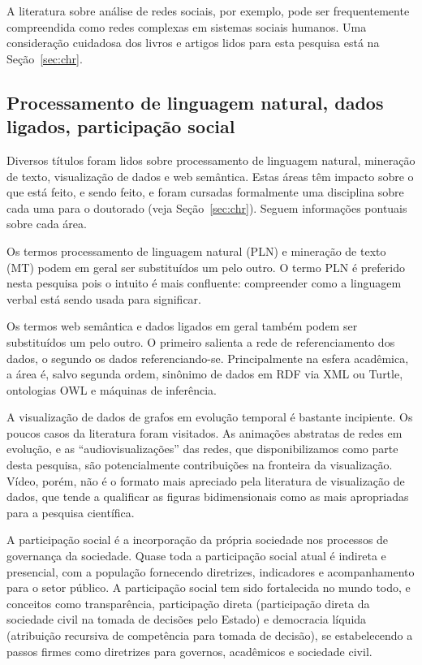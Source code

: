 \documentclass[a4paper,openright,12pt]{report} %
\begin{document}
A literatura sobre análise de redes sociais, por exemplo, pode ser frequentemente compreendida como redes complexas em sistemas sociais humanos.
Uma consideração cuidadosa dos livros e artigos lidos para esta pesquisa está na Seção~\ref{sec:chr}.

\subsection{Processamento de linguagem natural, dados ligados, participação social}\label{sec:misc}
Diversos títulos foram lidos sobre processamento de linguagem natural, mineração de texto,
visualização de dados e web semântica. Estas áreas têm impacto sobre o que está feito, e sendo feito,
e foram cursadas formalmente uma disciplina sobre cada uma para o doutorado (veja Seção~\ref{sec:chr}).
Seguem informações pontuais sobre cada área.

Os termos processamento de linguagem natural (PLN) e mineração de
texto (MT) podem em geral ser substituídos um pelo outro.
O termo PLN é preferido nesta pesquisa pois o intuito é mais confluente: 
compreender como a linguagem verbal está
sendo usada para significar.

Os termos web semântica e dados ligados em geral também podem ser 
substituídos um pelo outro. O primeiro salienta
a rede de referenciamento dos dados,
o segundo os dados referenciando-se. Principalmente na esfera
acadêmica, a área é, salvo segunda ordem, sinônimo de dados em 
RDF via XML ou Turtle, ontologias OWL e máquinas de inferência.

A visualização de dados de grafos em evolução temporal é bastante
incipiente. Os poucos casos da literatura foram visitados. As
animações abstratas de redes em evolução, e as ``audiovisualizações''
das redes, que disponibilizamos como parte desta pesquisa,
são potencialmente contribuições na fronteira da visualização.
Vídeo, porém, não é o formato mais apreciado pela literatura
de visualização de dados, que tende a qualificar as figuras
bidimensionais como as mais apropriadas para a pesquisa
científica.

A participação social é a incorporação da própria sociedade nos 
processos de governança da sociedade.
Quase toda a participação social atual é indireta e presencial, 
com a população fornecendo diretrizes, indicadores e acompanhamento
para o setor público.
A participação social tem sido fortalecida no mundo todo,
e conceitos como transparência, participação direta (participação direta 
da sociedade civil na tomada de decisões pelo Estado) e
democracia líquida (atribuição recursiva de competência para tomada
de decisão), se estabelecendo a passos firmes como diretrizes para
governos, acadêmicos e sociedade civil.
\end{document}
